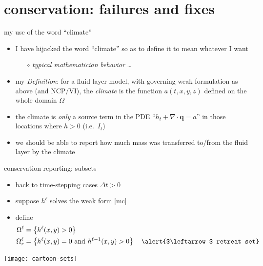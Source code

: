 \documentclass[xcolor={dvipsnames}]{beamer}
\newcommand\bq{\mathbf{q}}
\newcommand\Div{\nabla\cdot}
\begin{document}
\section{conservation: failures and fixes}

\begin{frame}{my use of the word ``climate''}

\begin{itemize}
\item I have hijacked the word ``climate'' so as to define it to mean whatever I want
     \begin{itemize}
     \item[$\circ$] \emph{typical mathematician behavior} \dots
     \end{itemize}

\bigskip
\item<2> my \emph{Definition}: for a fluid layer model, with governing weak formulation as above (and NCP/VI), the \emph{\alert{climate}} is the function $a(t,x,y,z)$ defined on the whole domain $\Omega$

\bigskip
\item<2> the climate is \emph{only} a source term in the PDE ``$h_t + \Div \bq = a$'' in those locations where $h>0$ (i.e.~$I_t$)
\item<2> we should be able to report how much mass was transferred to/from the fluid layer by the climate
\end{itemize}
\end{frame}


\begin{frame}{conservation reporting: subsets}
\begin{itemize}
\item back to time-stepping cases $\Delta t>0$
\item suppose $h^\ell$ solves the weak form \eqref{mc}
\item define
	\begin{align*}
	\Omega^\ell &= \left\{h^\ell(x,y) > 0\right\} \\
	\Omega^\ell_r &= \left\{h^\ell(x,y) = 0 \text{ and } h^{\ell-1}(x,y) > 0\right\} \quad \text{\alert{$\leftarrow$ retreat set}}
	\end{align*}
\end{itemize}

\vspace{-3mm}
\begin{center}
\texttt{[image: cartoon-sets]}
\end{center}
\end{frame}
\end{document}
